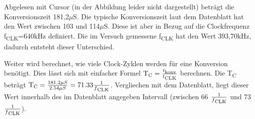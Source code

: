 Abgelesen mit Cursor (in der Abbildung leider nicht dargestellt) beträgt
die Konversionszeit 181,2$\mu$S. Die typische Konversionszeit laut dem Datenblatt
hat den Wert zwischen 103 und 114$\mu$S. Diese ist aber in Bezug auf die Clockfrequenz
f\textsubscript{CLK}=640kHz definiert. Die im Versuch gemessene f\textsubscript{CLK}
hat den Wert 393,70kHz, dadurch entsteht dieser Unterschied.\par

Weiter wird berechnet, wie viele Clock-Zyklen werden für eine Konversion benötigt.
Dies lässt sich mit einfacher Formel
$\text{T\textsubscript{C}}=\frac{t\textsubscript{konv}}{t\textsubscript{CLK}}$
berechnen. Die T\textsubscript{C} beträgt 
$\text{T\textsubscript{C}}=\frac{181.2\mu S}{2.54\mu S}=71.33\frac{1}{f\textsubscript{CLK}}$.
Vergliechen mit dem Datenblatt, liegt dieser Wert innerhalb des im Datenblatt
angegeben Intervall (zwischen 66 $\frac{1}{f\textsubscript{CLK}}$ und 73 $\frac{1}{f\textsubscript{CLK}}$).
